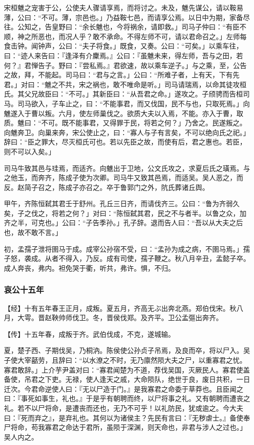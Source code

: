\documentclass[]{article}
\begin{document}
宋桓魋之宠害于公，公使夫人骤请享焉，而将讨之。未及，魋先谋公，请以鞍易薄，公曰：``不可。薄，宗邑也。」乃益鞍七邑，而请享公焉。以日中为期，家备尽往。公知之，告皇野曰：``余长魋也，今将祸余，请即救。」司马子仲曰：``有臣不顺，神之所恶也，而况人乎？敢不承命。不得左师不可，请以君命召之。」左师每食击钟。闻钟声，公曰：``夫子将食。」既食，又奏。公曰：``可矣。」以乘车往，曰：``迹人来告曰：『逢泽有介麇焉。』公曰：『虽魋未来，得左师，吾与之田，若何？』君惮告子。野曰：『尝私焉。』君欲速，故以乘车逆子。」与之乘，至，公告之故，拜，不能起。司马曰：``君与之言。」公曰：``所难子者，上有天，下有先君。」对曰：``魋之不共，宋之祸也，敢不唯命是听。」司马请瑞焉，以命其徒攻桓氏。其父兄故臣曰：``不可。」其新臣曰：``从吾君之命。」遂攻之。子颀骋而告桓司马。司马欲入，子车止之，曰：``不能事君，而又伐国，民不与也，只取死焉。」向魋遂入于曹以叛。六月，使左师巢伐之。欲质大夫以入焉，不能。亦入于曹，取质。魋曰：``不可。既不能事君，又得罪于民，将若之何？」乃舍之。民遂叛之。向魋奔卫。向巢来奔，宋公使止之，曰：``寡人与子有言矣，不可以绝向氏之祀。」辞曰：``臣之罪大，尽灭桓氏可也。若以先臣之故，而使有后，君之惠也。若臣，则不可以入矣。」

司马牛致其邑与珪焉，而适齐。向魋出于卫地，公文氏攻之，求夏后氏之璜焉。与之他玉，而奔齐，陈成子使为次卿。司马牛又致其邑焉，而适吴。吴人恶之，而反。赵简子召之，陈成子亦召之。卒于鲁郭门之外，阬氏葬诸丘舆。

甲午，齐陈恒弑其君壬于舒州。孔丘三日齐，而请伐齐三。公曰：``鲁为齐弱久矣，子之伐之，将若之何？」对曰：``陈恒弑其君，民之不与者半。以鲁之众，加齐之半，可克也。」公曰：``子告季孙。」孔子辞。退而告人曰：``吾以从大夫之后也，故不敢不言。」

初，孟孺子泄将圉马于成。成宰公孙宿不受，曰：``孟孙为成之病，不圉马焉。」孺子怒，袭成。从者不得入，乃反。成有司使，孺子鞭之。秋八月辛丑，孟懿子卒。成人奔丧，弗内。袒免哭于衢，听共，弗许。惧，不归。

\hypertarget{header-n3204}{%
\subsubsection{哀公十五年}\label{header-n3204}}

【经】十有五年春王正月，成叛。夏五月，齐高无ぶ出奔北燕。郑伯伐宋。秋八月，大雩。晋赵鞅帅师伐卫。冬，晋侯伐郑。及齐平。卫公孟彄出奔齐。

【传】十五年春，成叛于齐。武伯伐成，不克，遂城输。

夏，楚子西、子期伐吴，乃桐汭。陈侯使公孙贞子吊焉，及良而卒，将以尸入。吴子使大宰嚭劳，且辞曰：``以水潦之不时，无乃廪然陨大夫之尸，以重寡君之忧。寡君敢辞。」上介芋尹盖对曰：``寡君闻楚为不道，荐伐吴国，灭厥民人。寡君使盖备使，吊君之下吏。无禄，使人逢天之戚，大命陨队，绝世于良，废日共积，一日迁次。今君命逆使人曰：『无以尸造于门。』是我寡君之命委于草莽也。且臣闻之曰：『事死如事生，礼也。』于是乎有朝聘而终，以尸将事之礼。又有朝聘而遭丧之礼。若不以尸将命，是遭丧而还也，无乃不可乎！以礼防民，犹或逾之。今大夫曰：『死而弃之』，是弃礼也。其何以为诸侯主？先民有言曰：『无秽虐士。』备使奉尸将命，苟我寡君之命达于君所，虽陨于深渊，则天命也，非君与涉人之过也。」吴人内之。
\end{document}
